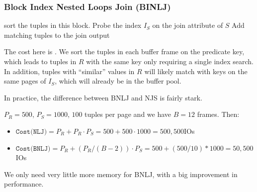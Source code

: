 \subsubsection{Block Index Nested Loops Join (BINLJ)}
\begin{algorithm}
    \caption{Block Index Nested Loops Join Algorithm}
    \begin{algorithmic}[1]
                \State sort the tuples in this block.
                    \State Probe the index $I_S$ on the join attribute of $S$
                    \State Add matching tuples to the join output
                \EndFor
            \EndFor
        \EndProcedure
    \end{algorithmic}
\end{algorithm}

The cost here is .
We sort the tuples in each buffer frame on the predicate key, which leads to tuples in $R$ with the same key only requiring a single index search.
In addition, tuples with ``similar'' values in $R$ will likely match with keys on the same pages of $I_S$, which will already be in the buffer pool.

In practice, the difference between BNLJ and NJS is fairly stark.

\inlineexample $P_R = 500$, $P_S = 1000$, $100$ tuples per page and we have $B = 12$ frames. Then:
\begin{itemize}
    \item $\texttt{Cost(NLJ)} = P_R + P_R \cdot P_S = 500 + 500 \cdot 1000 = 500,500$IOs
    \item $\texttt{Cost(BNLJ)} = P_R + (P_R / (B - 2)) \cdot P_S = 500 + (500 / 10) * 1000 = 50,500$IOs
\end{itemize}
We only need very little more memory for BNLJ, with a big improvement in performance.
